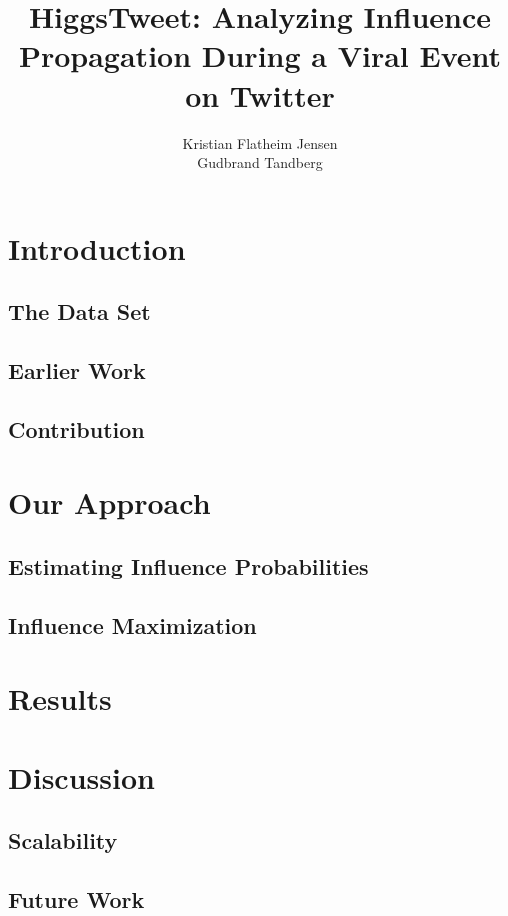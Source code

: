 \documentclass[12pt, oneside]{article}
\title{HiggsTweet: Analyzing Influence Propagation During a Viral Event on Twitter}
\author{Kristian Flatheim Jensen \\ Gudbrand Tandberg}
\begin{document}
\maketitle

\section{Introduction}

\subsection{The Data Set}

\subsection{Earlier Work}

\cite{chen2009efficient}

\subsection{Contribution}

\section{Our Approach}

\subsection{Estimating Influence Probabilities}


\subsection{Influence Maximization}

\section{Results} 

\section{Discussion}

\subsection{Scalability}

\subsection{Future Work}



\end{document}
